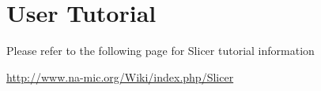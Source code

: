 \documentclass{InsightArticle}
\begin{document}
\section{User Tutorial}
Please refer to the following page for Slicer tutorial information

\url{http://www.na-mic.org/Wiki/index.php/Slicer}



%
%



\end{document}
